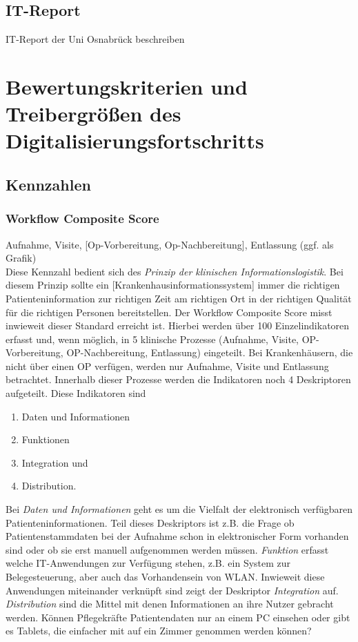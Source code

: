 	\subsection{IT-Report}
	IT-Report der Uni Osnabrück beschreiben
\section{Bewertungskriterien und Treibergrößen des Digitalisierungsfortschritts}
	\subsection{Kennzahlen}
	\subsubsection{Workflow Composite Score}
		Aufnahme, Visite, [Op-Vorbereitung, Op-Nachbereitung], Entlassung (ggf. als Grafik)\\
		Diese Kennzahl bedient sich des \textit{Prinzip der klinischen Informationslogistik}. Bei diesem Prinzip \glqq{}sollte ein [Krankenhausinformationssystem] immer die richtigen Patienteninformation zur richtigen Zeit am richtigen Ort in der richtigen Qualität für die richtigen Personen bereitstellen.\grqq\parencite[36]{huebner2019} Der Workflow Composite Score misst inwieweit dieser Standard erreicht ist. Hierbei werden über 100 Einzelindikatoren erfasst und, wenn möglich, in 5 klinische Prozesse (Aufnahme, Visite, OP-Vorbereitung, OP-Nachbereitung, Entlassung) eingeteilt. Bei Krankenhäusern, die nicht über einen OP verfügen, werden nur Aufnahme, Visite und Entlassung betrachtet. Innerhalb dieser Prozesse werden die Indikatoren noch 4 Deskriptoren aufgeteilt. Diese Indikatoren sind
		\begin{enumerate}
			\item Daten und Informationen
			\item Funktionen
			\item Integration und
			\item Distribution.
		\end{enumerate}
		Bei \textit{Daten und Informationen} geht es um die Vielfalt der elektronisch verfügbaren Patienteninformationen. Teil dieses Deskriptors ist z.B. die Frage ob Patientenstammdaten bei der Aufnahme schon in elektronischer Form vorhanden sind oder ob sie erst manuell aufgenommen werden müssen. \textit{Funktion} erfasst welche IT-Anwendungen zur Verfügung stehen, z.B. ein System zur Belegesteuerung, aber auch das Vorhandensein von WLAN. Inwieweit diese Anwendungen miteinander verknüpft sind zeigt der Deskriptor \textit{Integration} auf. \textit{Distribution} sind die Mittel mit denen Informationen an ihre Nutzer gebracht werden. Können Pflegekräfte Patientendaten nur an einem PC einsehen oder gibt es Tablets, die einfacher mit auf ein Zimmer genommen werden können?

